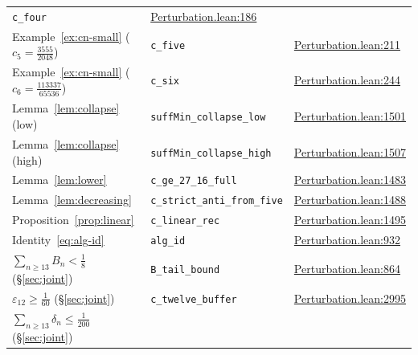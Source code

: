 \documentclass[reqno,final,11pt]{amsart}
\theoremstyle{plain}
\theoremstyle{definition}
\theoremstyle{remark}
\begin{document}
\begin{table}[h]
\begin{tabular}{@{}lll@{}}
  \texttt{c\_four} &
  \href{https://github.com/pfaffelh/coins/blob/c60bcd3/CoinsLean/CoinsLean/Perturbation.lean\#L186}{Perturbation.lean:186} \\
Example~\ref{ex:cn-small} ($c_5=\tfrac{3555}{2048}$) &
  \texttt{c\_five} &
  \href{https://github.com/pfaffelh/coins/blob/c60bcd3/CoinsLean/CoinsLean/Perturbation.lean\#L211}{Perturbation.lean:211} \\
Example~\ref{ex:cn-small} ($c_6=\tfrac{113337}{65536}$) &
  \texttt{c\_six} &
  \href{https://github.com/pfaffelh/coins/blob/c60bcd3/CoinsLean/CoinsLean/Perturbation.lean\#L244}{Perturbation.lean:244} \\
Lemma~\ref{lem:collapse} (low) &
  \texttt{suffMin\_collapse\_low} &
  \href{https://github.com/pfaffelh/coins/blob/c60bcd3/CoinsLean/CoinsLean/Perturbation.lean\#L1501}{Perturbation.lean:1501} \\
Lemma~\ref{lem:collapse} (high) &
  \texttt{suffMin\_collapse\_high} &
  \href{https://github.com/pfaffelh/coins/blob/c60bcd3/CoinsLean/CoinsLean/Perturbation.lean\#L1507}{Perturbation.lean:1507} \\
Lemma~\ref{lem:lower} &
  \texttt{c\_ge\_27\_16\_full} &
  \href{https://github.com/pfaffelh/coins/blob/c60bcd3/CoinsLean/CoinsLean/Perturbation.lean\#L1483}{Perturbation.lean:1483} \\
Lemma~\ref{lem:decreasing} &
  \texttt{c\_strict\_anti\_from\_five} &
  \href{https://github.com/pfaffelh/coins/blob/c60bcd3/CoinsLean/CoinsLean/Perturbation.lean\#L1488}{Perturbation.lean:1488} \\
Proposition~\ref{prop:linear} &
  \texttt{c\_linear\_rec} &
  \href{https://github.com/pfaffelh/coins/blob/c60bcd3/CoinsLean/CoinsLean/Perturbation.lean\#L1495}{Perturbation.lean:1495} \\
Identity~\eqref{eq:alg-id} &
  \texttt{alg\_id} &
  \href{https://github.com/pfaffelh/coins/blob/c60bcd3/CoinsLean/CoinsLean/Perturbation.lean\#L932}{Perturbation.lean:932} \\
$\sum_{n\ge 13}B_n<\tfrac{1}{8}$ (\S\ref{sec:joint}) &
  \texttt{B\_tail\_bound} &
  \href{https://github.com/pfaffelh/coins/blob/c60bcd3/CoinsLean/CoinsLean/Perturbation.lean\#L864}{Perturbation.lean:864} \\
$\varepsilon_{12}\ge\tfrac{1}{60}$ (\S\ref{sec:joint}) &
  \texttt{c\_twelve\_buffer} &
  \href{https://github.com/pfaffelh/coins/blob/c60bcd3/CoinsLean/CoinsLean/Perturbation.lean\#L2995}{Perturbation.lean:2995} \\
$\sum_{n\ge 13}\delta_n\le\tfrac{1}{200}$ (\S\ref{sec:joint}) &

\end{tabular}
\end{table}
\end{document}
